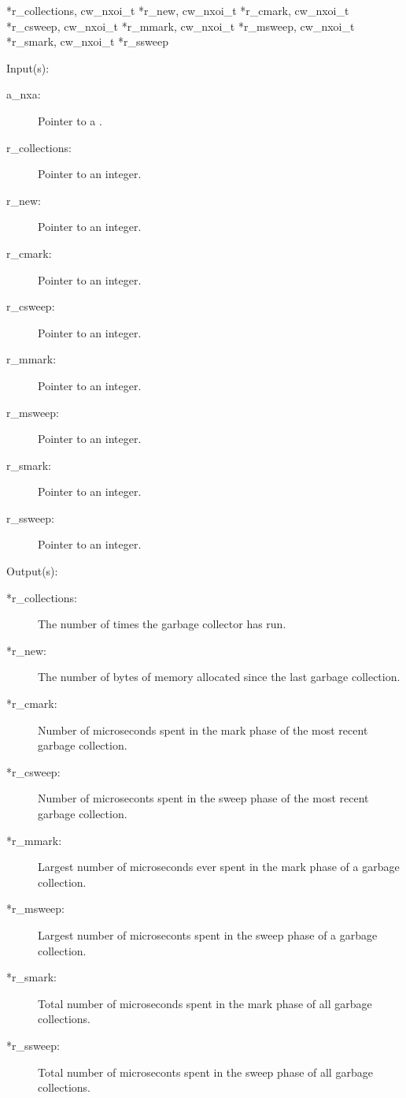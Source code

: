 \begin{capi}
{{*r\_collections, cw\_nxoi\_t *r\_new, cw\_nxoi\_t *r\_cmark, cw\_nxoi\_t
*r\_csweep, cw\_nxoi\_t *r\_mmark, cw\_nxoi\_t *r\_msweep, cw\_nxoi\_t
*r\_smark, cw\_nxoi\_t *r\_ssweep}}
	\begin{capilist}
	\item[Input(s): ]
		\begin{description}\item[]
		\item[a\_nxa: ]
			Pointer to a .
		\item[r\_collections: ]
			Pointer to an integer.
		\item[r\_new: ]
			Pointer to an integer.
		\item[r\_cmark: ]
			Pointer to an integer.
		\item[r\_csweep: ]
			Pointer to an integer.
		\item[r\_mmark: ]
			Pointer to an integer.
		\item[r\_msweep: ]
			Pointer to an integer.
		\item[r\_smark: ]
			Pointer to an integer.
		\item[r\_ssweep: ]
			Pointer to an integer.
		\end{description}
	\item[Output(s): ]
		\begin{description}\item[]
		\item[*r\_collections: ]
			The number of times the garbage collector has run.
		\item[*r\_new: ]
			The number of bytes of memory allocated since the last
			garbage collection.
		\item[*r\_cmark: ]
			Number of microseconds spent in the mark phase of the
			most recent garbage collection.
		\item[*r\_csweep: ]
			Number of microseconts spent in the sweep phase of the
			most recent garbage collection.
		\item[*r\_mmark: ]
			Largest number of microseconds ever spent in the mark
			phase of a garbage collection.
		\item[*r\_msweep: ]
			Largest number of microseconts spent in the sweep phase
			of a garbage collection.
		\item[*r\_smark: ]
			Total number of microseconds spent in the mark phase of
			all garbage collections.
		\item[*r\_ssweep: ]
			Total number of microseconts spent in the sweep phase of
			all garbage collections.
		\end{description}

\end{capilist}
\end{capi}
